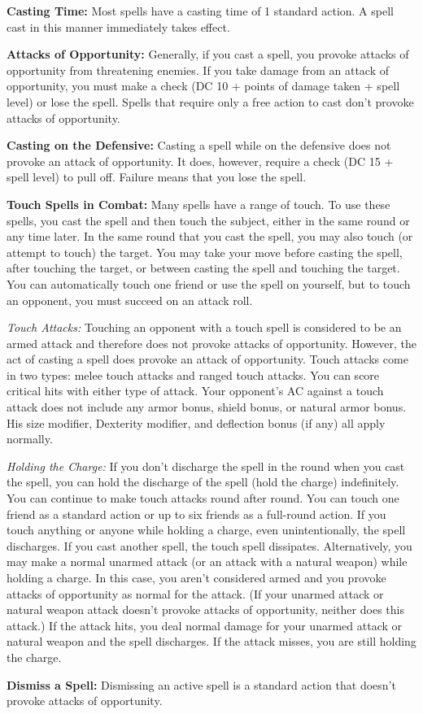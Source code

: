 \textbf{Casting Time:} Most spells have a casting time of 1 standard action. A spell cast in this manner immediately takes effect.

\textbf{Attacks of Opportunity:} Generally, if you cast a spell, you provoke attacks of opportunity from threatening enemies. If you take damage from an attack of opportunity, you must make a  check (DC 10 + points of damage taken + spell level) or lose the spell. Spells that require only a free action to cast don't provoke attacks of opportunity.

\textbf{Casting on the Defensive:} Casting a spell while on the defensive does not provoke an attack of opportunity. It does, however, require a  check (DC 15 + spell level) to pull off. Failure means that you lose the spell.

\textbf{Touch Spells in Combat:} Many spells have a range of touch. To use these spells, you cast the spell and then touch the subject, either in the same round or any time later. In the same round that you cast the spell, you may also touch (or attempt to touch) the target. You may take your move before casting the spell, after touching the target, or between casting the spell and touching the target. You can automatically touch one friend or use the spell on yourself, but to touch an opponent, you must succeed on an attack roll.

\textit{Touch Attacks:} Touching an opponent with a touch spell is considered to be an armed attack and therefore does not provoke attacks of opportunity. However, the act of casting a spell does provoke an attack of opportunity. Touch attacks come in two types: melee touch attacks and ranged touch attacks. You can score critical hits with either type of attack. Your opponent's AC against a touch attack does not include any armor bonus, shield bonus, or natural armor bonus. His size modifier, Dexterity modifier, and deflection bonus (if any) all apply normally.

\textit{Holding the Charge:} If you don't discharge the spell in the round when you cast the spell, you can hold the discharge of the spell (hold the charge) indefinitely. You can continue to make touch attacks round after round. You can touch one friend as a standard action or up to six friends as a full-round action. If you touch anything or anyone while holding a charge, even unintentionally, the spell discharges. If you cast another spell, the touch spell dissipates. Alternatively, you may make a normal unarmed attack (or an attack with a natural weapon) while holding a charge. In this case, you aren't considered armed and you provoke attacks of opportunity as normal for the attack. (If your unarmed attack or natural weapon attack doesn't provoke attacks of opportunity, neither does this attack.) If the attack hits, you deal normal damage for your unarmed attack or natural weapon and the spell discharges. If the attack misses, you are still holding the charge.

\textbf{Dismiss a Spell:} Dismissing an active spell is a standard action that doesn't provoke attacks of opportunity.